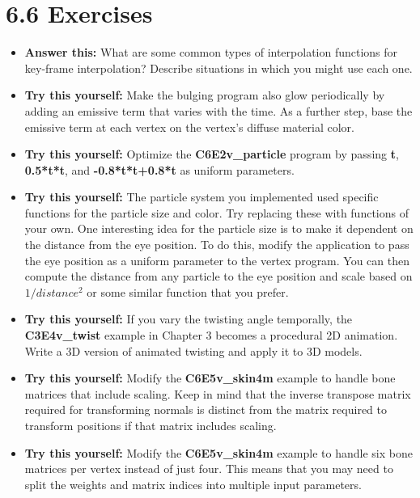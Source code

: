 \documentclass[../main.tex]{subfiles}
\begin{document}
\section{6.6 Exercises}

\begin{itemize}

\item \textbf{Answer this:} What are some common types of interpolation functions for key-frame interpolation? Describe situations in which you might use each one.

\item \textbf{Try this yourself:} Make the bulging program also glow periodically by adding an emissive term that varies with the time. As a further step, base the emissive term at each vertex on the vertex's diffuse material color.

\item \textbf{Try this yourself:} Optimize the \textbf{C6E2v_particle} program by passing \textbf{t}, \textbf{0.5*t*t}, and \textbf{-0.8*t*t+0.8*t} as uniform parameters.

\item \textbf{Try this yourself:} The particle system you implemented used specific functions for the particle size and color. Try replacing these with functions of your own. One interesting idea for the particle size is to make it dependent on the distance from the eye position. To do this, modify the application to pass the eye position as a uniform parameter to the vertex program. You can then compute the distance from any particle to the eye position and scale based on $1/distance^2$ or some similar function that you prefer.

\item \textbf{Try this yourself:} If you vary the twisting angle temporally, the \textbf{C3E4v_twist} example in Chapter 3 becomes a procedural 2D animation. Write a 3D version of animated twisting and apply it to 3D models.

\item \textbf{Try this yourself:} Modify the \textbf{C6E5v_skin4m} example to handle bone matrices that include scaling. Keep in mind that the inverse transpose matrix required for transforming normals is distinct from the matrix required to transform positions if that matrix includes scaling.

\item \textbf{Try this yourself:} Modify the \textbf{C6E5v_skin4m} example to handle six bone matrices per vertex instead of just four. This means that you may need to split the weights and matrix indices into multiple input parameters.
\end{itemize}
\end{document}
